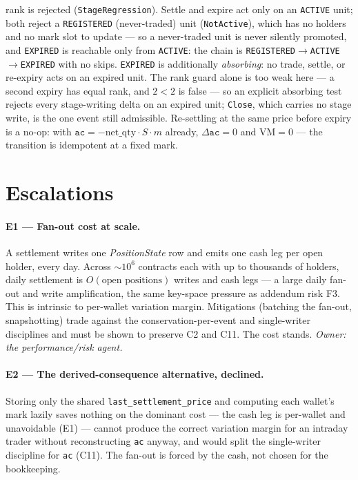 \documentclass[11pt]{article}
\newcommand{\ac}{\texttt{ac}}
\newcommand{\netq}{\mathrm{net\_qty}}
\newcommand{\code}[1]{\texttt{#1}}
\newcommand{\mult}{m}
\begin{document}
\begin{itemize}
rank is rejected (\code{StageRegression}). Settle and expire act only on an \code{ACTIVE} unit; both
reject a \code{REGISTERED} (never-traded) unit (\code{NotActive}), which has no holders and no mark
slot to update --- so a never-traded unit is never silently promoted, and \code{EXPIRED} is reachable
only from \code{ACTIVE}: the chain is \code{REGISTERED}$\to$\code{ACTIVE}$\to$\code{EXPIRED} with no
skips. \code{EXPIRED} is additionally \emph{absorbing}: no
trade, settle, or re-expiry acts on an expired unit. The rank guard alone is too weak here --- a
second expiry has equal rank, and $2<2$ is false --- so an explicit absorbing test rejects every
stage-writing delta on an expired unit; \code{Close}, which carries no stage write, is the one event
still admissible. Re-settling at the same price before expiry is a no-op: with
$\ac=-\netq\cdot S\cdot\mult$ already, $\Delta\ac=0$ and $\mathrm{VM}=0$ --- the transition is
idempotent at a fixed mark.
\end{itemize}

\section{Escalations}

\paragraph{E1 --- Fan-out cost at scale.} A settlement writes one \emph{PositionState} row and emits
one cash leg per open holder, every day. Across $\sim\!10^{6}$ contracts each with up to thousands of
holders, daily settlement is $O(\text{open positions})$ writes and cash legs --- a large daily
fan-out and write amplification, the same key-space pressure as addendum risk F3. This is intrinsic
to per-wallet variation margin. Mitigations (batching the fan-out, snapshotting) trade against the
conservation-per-event and single-writer disciplines and must be shown to preserve C2 and C11. The
cost stands. \emph{Owner: the performance/risk agent.}

\paragraph{E2 --- The derived-consequence alternative, declined.} Storing only the shared
\code{last\_settlement\_price} and computing each wallet's mark lazily saves nothing on the dominant
cost --- the cash leg is per-wallet and unavoidable (E1) --- cannot produce the correct variation
margin for an intraday trader without reconstructing \ac{} anyway, and would split the single-writer
discipline for \ac{} (C11). The fan-out is forced by the cash, not chosen for the bookkeeping.
\end{document}
